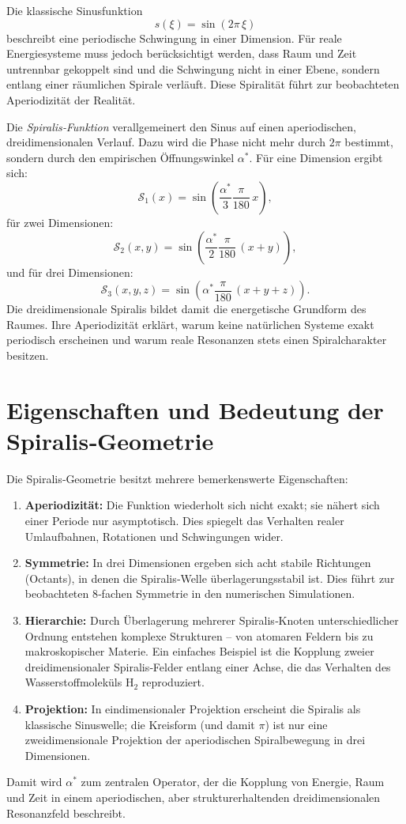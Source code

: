 Die klassische Sinusfunktion
\[
s(\xi) = \sin(2\pi\,\xi)
\]
beschreibt eine periodische Schwingung in einer Dimension.
Für reale Energiesysteme muss jedoch berücksichtigt werden,
dass Raum und Zeit untrennbar gekoppelt sind
und die Schwingung nicht in einer Ebene,
sondern entlang einer räumlichen Spirale verläuft.
Diese Spiralität führt zur beobachteten Aperiodizität der Realität.

Die \emph{Spiralis‐Funktion} verallgemeinert den Sinus
auf einen aperiodischen, dreidimensionalen Verlauf.
Dazu wird die Phase nicht mehr durch $2\pi$ bestimmt,
sondern durch den empirischen Öffnungswinkel $\alpha^*$.
Für eine Dimension ergibt sich:
\[
\mathcal{S}_1(x) = \sin\!\left(\frac{\alpha^*}{3}\frac{\pi}{180}\,x\right),
\]
für zwei Dimensionen:
\[
\mathcal{S}_2(x,y) = \sin\!\left(\frac{\alpha^*}{2}\frac{\pi}{180}\,(x+y)\right),
\]
und für drei Dimensionen:
\[
\boxed{
\mathcal{S}_3(x,y,z)
= \sin\!\left(\alpha^*\frac{\pi}{180}\,(x+y+z)\right).
}
\]
Die dreidimensionale Spiralis bildet damit
die energetische Grundform des Raumes.
Ihre Aperiodizität erklärt,
warum keine natürlichen Systeme exakt periodisch erscheinen
und warum reale Resonanzen stets einen Spiralcharakter besitzen.

\section{Eigenschaften und Bedeutung der Spiralis‐Geometrie}

Die Spiralis‐Geometrie besitzt mehrere bemerkenswerte Eigenschaften:

\begin{enumerate}
\item \textbf{Aperiodizität:}
Die Funktion wiederholt sich nicht exakt;
sie nähert sich einer Periode nur asymptotisch.
Dies spiegelt das Verhalten realer Umlaufbahnen,
Rotationen und Schwingungen wider.

\item \textbf{Symmetrie:}
In drei Dimensionen ergeben sich acht stabile Richtungen
(Octants), in denen die Spiralis‐Welle
überlagerungsstabil ist.
Dies führt zur beobachteten 8‐fachen Symmetrie
in den numerischen Simulationen.

\item \textbf{Hierarchie:}
Durch Überlagerung mehrerer Spiralis‐Knoten
unterschiedlicher Ordnung entstehen komplexe Strukturen
– von atomaren Feldern bis zu makroskopischer Materie.
Ein einfaches Beispiel ist die Kopplung zweier
dreidimensionaler Spiralis‐Felder entlang einer Achse,
die das Verhalten des Wasserstoffmoleküls H$_2$ reproduziert.

\item \textbf{Projektion:}
In eindimensionaler Projektion
erscheint die Spiralis als klassische Sinuswelle;
die Kreisform (und damit $\pi$) ist
nur eine zweidimensionale Projektion
der aperiodischen Spiralbewegung in drei Dimensionen.
\end{enumerate}

Damit wird $\alpha^*$ zum zentralen Operator,
der die Kopplung von Energie, Raum und Zeit
in einem aperiodischen, aber strukturerhaltenden
dreidimensionalen Resonanzfeld beschreibt.
